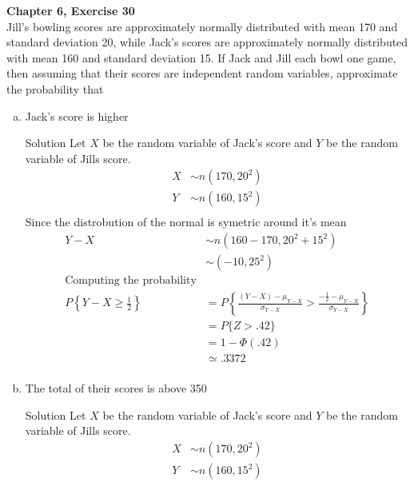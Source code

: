 \documentclass{article}
\begin{document}
\begin{spacing}{1.1}
\newpage
\begin{homeworkProblem}
  {\bf Chapter 6, Exercise 30}\\
  Jill's bowling scores are approximately normally distributed with 
  mean 170 and standard deviation 20, while Jack's scores are 
  approximately normally distributed with mean 160 and standard 
  deviation 15. If Jack and Jill each bowl one game, then assuming 
  that their scores are independent random variables, approximate 
  the probability that
  \begin{enumerate}[(a)]
    \item Jack's score is higher
      \begin{homeworkSection}{Solution}
        Let $X$ be the random variable of Jack's score and
        $Y$ be the random variable of Jills score.
        \begin{align*}
          X &\sim n( 170, 20^2)\\
          Y &\sim n( 160, 15^2)\\
        \end{align*}
          Since the distrobution of the normal
          is symetric around it's mean
        \begin{align*}
          Y - X &\sim n( 160 - 170, 20^2 + 15^2)\\
          &\sim( -10, 25^2)\\
          \text{Computing the probability}\\
          P\left\{ Y - X \ge \frac{ 1}{ 2}\right\} 
          &= P\left\{ \frac{ (Y - X) - \mu_{Y - X}}{ \sigma_{Y - X}}
            > \frac{ -\frac{ 1}{ 2} - \mu_{Y - X}}{ \sigma_{Y - X}}\right\}\\
          &= P\{ Z > .42 \}\\
          &= 1 - \Phi(.42)\\
          &\simeq .3372\\
        \end{align*}
      \end{homeworkSection}
    \item The total of their scores is above 350
      \begin{homeworkSection}{Solution}
        Let $X$ be the random variable of Jack's score and
        $Y$ be the random variable of Jills score.
        \begin{align*}
          X &\sim n( 170, 20^2)\\
          Y &\sim n( 160, 15^2)\\

\end{align*}
\end{homeworkSection}
\end{enumerate}
\end{homeworkProblem}
\end{spacing}
\end{document}
